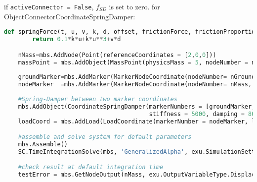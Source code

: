     \ee
    if \texttt{activeConnector = False}, $f_{SD}$ is set to zero.
 for ObjectConnectorCoordinateSpringDamper:
\pythonstyle
\begin{lstlisting}[language=Python, firstnumber=1]
    def springForce(t, u, v, k, d, offset, frictionForce, frictionProportionalZone):
        return 0.1*k*u+k*u**3+v*d

    nMass=mbs.AddNode(Point(referenceCoordinates = [2,0,0]))
    massPoint = mbs.AddObject(MassPoint(physicsMass = 5, nodeNumber = nMass))
    
    groundMarker=mbs.AddMarker(MarkerNodeCoordinate(nodeNumber= nGround, coordinate = 0))
    nodeMarker  =mbs.AddMarker(MarkerNodeCoordinate(nodeNumber= nMass, coordinate = 0))
    
    #Spring-Damper between two marker coordinates
    mbs.AddObject(CoordinateSpringDamper(markerNumbers = [groundMarker, nodeMarker], 
                                         stiffness = 5000, damping = 80, springForceUserFunction = springForce)) 
    loadCoord = mbs.AddLoad(LoadCoordinate(markerNumber = nodeMarker, load = 1)) #static linear solution:0.002

    #assemble and solve system for default parameters
    mbs.Assemble()
    SC.TimeIntegrationSolve(mbs, 'GeneralizedAlpha', exu.SimulationSettings())

    #check result at default integration time
    testError = mbs.GetNodeOutput(nMass, exu.OutputVariableType.Displacement)[0] - 0.0019995158325691875

\end{lstlisting}

\newpage

